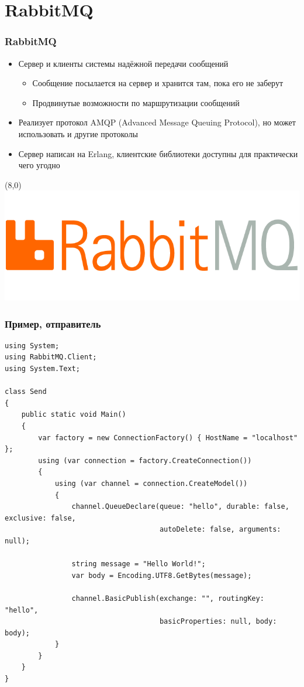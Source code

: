\documentclass[xetex,mathserif,serif]{beamer}
\begin{document}
	\section{RabbitMQ}

	\begin{frame}
		\frametitle{RabbitMQ}
		\begin{itemize}
			\item Сервер и клиенты системы надёжной передачи сообщений
			\begin{itemize}
				\item Сообщение посылается на сервер и хранится там, пока его не заберут
				\item Продвинутые возможности по маршрутизации сообщений
			\end{itemize}
			\item Реализует протокол AMQP (Advanced Message Queuing Protocol), но может использовать и другие протоколы
			\item Сервер написан на Erlang, клиентские библиотеки доступны для практически чего угодно
		\end{itemize}
		\begin{textblock}{3}(8,0)
			\includegraphics[width=\textwidth]{rabbitmqLogo.png}
		\end{textblock}
	\end{frame}

	\begin{frame}[fragile]
		\frametitle{Пример, отправитель}
		\begin{ssmall}
			\begin{verbatim}
using System;
using RabbitMQ.Client;
using System.Text;

class Send
{
    public static void Main()
    {
        var factory = new ConnectionFactory() { HostName = "localhost" };
        using (var connection = factory.CreateConnection())
        {
            using (var channel = connection.CreateModel())
            {
                channel.QueueDeclare(queue: "hello", durable: false, exclusive: false,
                                     autoDelete: false, arguments: null);

                string message = "Hello World!";
                var body = Encoding.UTF8.GetBytes(message);

                channel.BasicPublish(exchange: "", routingKey: "hello",
                                     basicProperties: null, body: body);
            }
        }
    }
}
			\end{verbatim}
		\end{ssmall}
	\end{frame}
\end{document}
